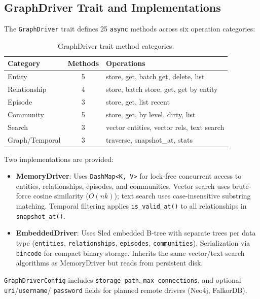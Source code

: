 \documentclass[11pt,a4paper,twocolumn]{article}
\begin{document}
\subsection{GraphDriver Trait and Implementations}
\label{sec:drivers}

The \texttt{GraphDriver} trait defines 25 \texttt{async} methods
across six operation categories:

\begin{table}[H]
\centering
\caption{GraphDriver trait method categories.}
\label{tab:driver}
\begin{tabularx}{\columnwidth}{lcX}
\toprule
\textbf{Category} & \textbf{Methods} & \textbf{Operations} \\
\midrule
Entity & 5 & store, get, batch get, delete, list \\
Relationship & 4 & store, batch store, get, get by entity \\
Episode & 3 & store, get, list recent \\
Community & 5 & store, get, by level, dirty, list \\
Search & 3 & vector entities, vector rels, text search \\
Graph/Temporal & 3 & traverse, snapshot\_at, stats \\
\bottomrule
\end{tabularx}
\end{table}

Two implementations are provided:

\begin{itemize}[leftmargin=*]
  \item \textbf{MemoryDriver}: Uses \texttt{DashMap<K, V>} for
    lock-free concurrent access to entities, relationships,
    episodes, and communities. Vector search uses brute-force
    cosine similarity ($O(nk)$); text search uses case-insensitive
    substring matching. Temporal filtering applies
    \texttt{is\_valid\_at()} to all relationships in
    \texttt{snapshot\_at()}.
  \item \textbf{EmbeddedDriver}: Uses Sled embedded B-tree with
    separate trees per data type (\texttt{entities},
    \texttt{relationships}, \texttt{episodes}, \texttt{communities}).
    Serialization via \texttt{bincode} for compact binary storage.
    Inherits the same vector/text search algorithms as MemoryDriver
    but reads from persistent disk.
\end{itemize}

\texttt{GraphDriverConfig} includes \texttt{storage\_path},
\texttt{max\_connections}, and optional \texttt{uri}/\texttt{username}/
\texttt{password} fields for planned remote drivers (Neo4j, FalkorDB).
\end{document}
